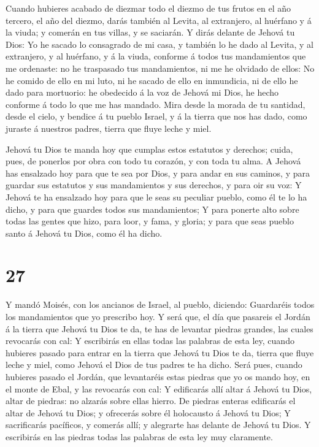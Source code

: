  Cuando hubieres acabado de diezmar todo el diezmo de tus
frutos en el año tercero, el año del diezmo, darás también al Levita, al
extranjero, al huérfano y á la viuda; y comerán en tus villas, y se
saciarán.  Y dirás delante de Jehová tu Dios: Yo he sacado
lo consagrado de mi casa, y también lo he dado al Levita, y al
extranjero, y al huérfano, y á la viuda, conforme á todos tus
mandamientos que me ordenaste: no he traspasado tus mandamientos, ni me
he olvidado de ellos:  No he comido de ello en mi luto, ni
he sacado de ello en inmundicia, ni de ello he dado para mortuorio: he
obedecido á la voz de Jehová mi Dios, he hecho conforme á todo lo que me
has mandado.  Mira desde la morada de tu santidad, desde el
cielo, y bendice á tu pueblo Israel, y á la tierra que nos has dado,
como juraste á nuestros padres, tierra que fluye leche y miel.

 Jehová tu Dios te manda hoy que cumplas estos estatutos y
derechos; cuida, pues, de ponerlos por obra con todo tu corazón, y con
toda tu alma.  A Jehová has ensalzado hoy para que te sea
por Dios, y para andar en sus caminos, y para guardar sus estatutos y
sus mandamientos y sus derechos, y para oir su voz:  Y
Jehová te ha ensalzado hoy para que le seas su peculiar pueblo, como él
te lo ha dicho, y para que guardes todos sus mandamientos; 
Y para ponerte alto sobre todas las gentes que hizo, para loor, y fama,
y gloria; y para que seas pueblo santo á Jehová tu Dios, como él ha
dicho.

\hypertarget{section-26}{%
\section{27}\label{section-26}}

 Y mandó Moisés, con los ancianos de Israel, al pueblo,
diciendo: Guardaréis todos los mandamientos que yo prescribo hoy.
 Y será que, el día que pasareis el Jordán á la tierra que
Jehová tu Dios te da, te has de levantar piedras grandes, las cuales
revocarás con cal:  Y escribirás en ellas todas las palabras
de esta ley, cuando hubieres pasado para entrar en la tierra que Jehová
tu Dios te da, tierra que fluye leche y miel, como Jehová el Dios de tus
padres te ha dicho.  Será pues, cuando hubieres pasado el
Jordán, que levantaréis estas piedras que yo os mando hoy, en el monte
de Ebal, y las revocarás con cal:  Y edificarás allí altar á
Jehová tu Dios, altar de piedras: no alzarás sobre ellas hierro.
 De piedras enteras edificarás el altar de Jehová tu Dios; y
ofrecerás sobre él holocausto á Jehová tu Dios;  Y
sacrificarás pacíficos, y comerás allí; y alegrarte has delante de
Jehová tu Dios.  Y escribirás en las piedras todas las
palabras de esta ley muy claramente.

